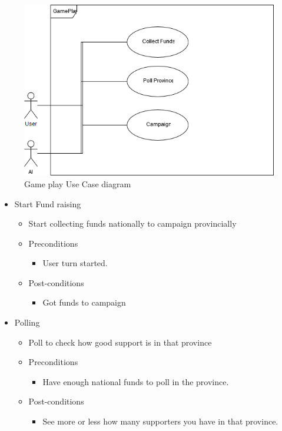 \documentclass{article}
\begin{document}
	\begin{figure}[h!]
        \includegraphics[width=0.8\linewidth]{Images/GamePlay.png}
        \caption{Game play Use Case diagram}
    \end{figure}
	\begin{itemize}
   		\item  Start Fund raising
			\begin{itemize}
				\item Start collecting funds nationally to campaign provincially 
				\item Preconditions
				\begin{itemize}
					\item User turn started.
				\end{itemize}
				\item Post-conditions
				\begin{itemize}
					\item Got funds to campaign
				\end{itemize}
			\end{itemize}
	\end{itemize}
	
	\begin{itemize}
   		\item  Polling
			\begin{itemize}
				\item Poll to check how good support is in that province
				\item Preconditions
				\begin{itemize}
					\item Have enough national funds to poll in the province.
				\end{itemize}
				\item Post-conditions
				\begin{itemize}
					\item See more or less how many supporters you have in that province.
				\end{itemize}
			\end{itemize}
	\end{itemize}
	
\end{document}
